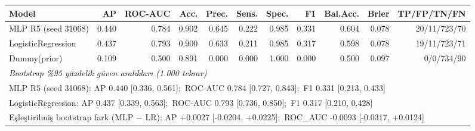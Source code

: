 \begin{tabular}{lrrrrrrrrrr}\toprule
Model & AP & ROC-AUC & Acc. & Prec. & Sens. & Spec. & F1 & Bal.Acc. & Brier & TP/FP/TN/FN \\\midrule
MLP R5 (seed 31068) & 0.440 & 0.784 & 0.902 & 0.645 & 0.222 & 0.985 & 0.331 & 0.604 & 0.078 & 20/11/723/70 \\
LogisticRegression & 0.437 & 0.793 & 0.900 & 0.633 & 0.211 & 0.985 & 0.317 & 0.598 & 0.078 & 19/11/723/71 \\
Dummy(prior) & 0.109 & 0.500 & 0.891 & 0.000 & 0.000 & 1.000 & 0.000 & 0.500 & 0.097 & 0/0/734/90 \\
\midrule
\multicolumn{11}{l}{\textit{Bootstrap \%95 yüzdelik güven aralıkları (1.000 tekrar)}} \\
\multicolumn{11}{l}{MLP R5 (seed 31068): AP 0.440 [0.336, 0.561];\ ROC-AUC 0.784 [0.727, 0.843];\ F1 0.331 [0.213, 0.433]} \\
\multicolumn{11}{l}{LogisticRegression: AP 0.437 [0.339, 0.563];\ ROC-AUC 0.793 [0.736, 0.850];\ F1 0.317 [0.210, 0.428]} \\
\multicolumn{11}{l}{Eşleştirilmiş bootstrap fark (MLP $-$ LR): AP +0.0027 [-0.0204, +0.0225];\ ROC\_AUC -0.0093 [-0.0317, +0.0124]} \\
\bottomrule\end{tabular}